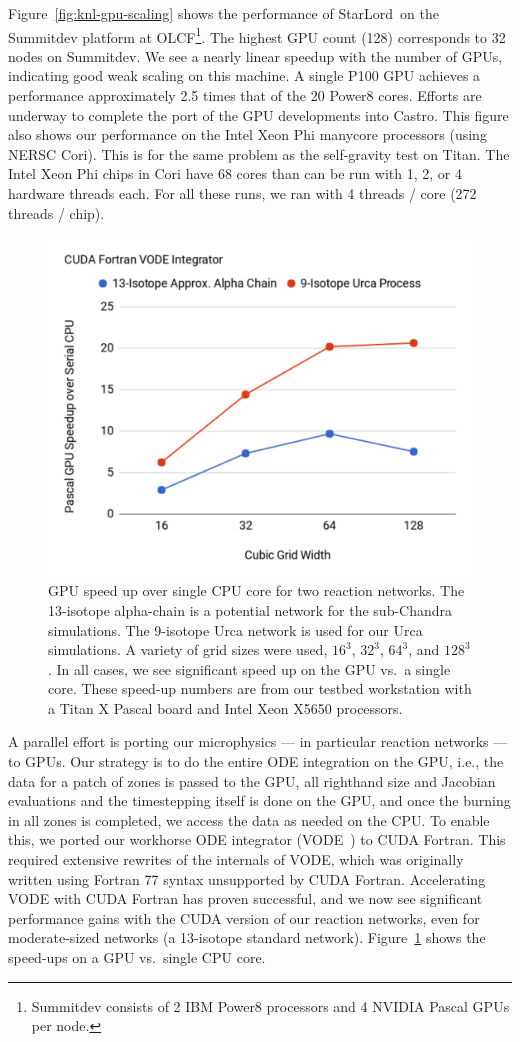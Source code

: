 \documentclass[a4paper]{jpconf}
\newcommand{\castro}{{\sffamily Castro}}
\newcommand{\starlord}{{\sffamily StarLord}}
\begin{document}
Figure~\ref{fig:knl-gpu-scaling} shows the performance of
\starlord\ on the Summitdev platform at OLCF\footnote{Summitdev
  consists of 2 IBM Power8 processors and 4 NVIDIA Pascal GPUs per
  node.}.  The highest GPU count (128) corresponds to 32 nodes on
Summitdev.  We see a nearly linear speedup with the number of GPUs,
indicating good weak scaling on this machine. A single P100 GPU achieves
a performance approximately 2.5 times that of the 20 Power8 cores. Efforts are underway to
complete the port of the GPU developments into \castro.  This figure
also shows our performance on the Intel Xeon Phi manycore processors (using
NERSC Cori).  This is for the same problem as the self-gravity test on
Titan.  The Intel Xeon Phi chips in Cori
have 68 cores than can be run with 1, 2, or 4 hardware threads each.
For all these runs, we ran with 4 threads / core (272
threads / chip).

\begin{figure}[t]
\centering
\includegraphics[width=0.48\linewidth]{CUDA-Fortran-VODE-Integrator}
\begin{minipage}[b]{0.48\linewidth}
\caption{\label{fig:cudaode} GPU speed up over single CPU core for two
  reaction networks.  The 13-isotope alpha-chain is a
  potential network for the sub-Chandra simulations.
  The 9-isotope Urca network is used for our Urca simulations.  A
  variety of grid sizes were used, $16^3$, $32^3$, $64^3$, and
  $128^3$.  In all cases, we see significant speed up on the GPU
  vs.\ a single core.  These speed-up numbers are from our testbed
  workstation with a Titan X Pascal board and Intel Xeon X5650 processors.}
\end{minipage}
\end{figure}

A parallel effort is porting our microphysics --- in particular
reaction networks --- to GPUs.  Our strategy is to do the entire ODE
integration on the GPU, i.e., the data for a patch of zones is passed
to the GPU, all righthand size and Jacobian evaluations and the
timestepping itself is done on the GPU, and once the burning in all
zones is completed, we access the data as needed on the CPU.  To
enable this, we ported our workhorse ODE integrator (VODE~\cite{vode})
to CUDA Fortran. This required extensive rewrites of the internals of
VODE, which was originally written using Fortran 77 syntax unsupported
by CUDA Fortran. Accelerating VODE with CUDA Fortran has proven
successful, and we now see significant performance gains with the CUDA
version of our reaction networks, even for moderate-sized networks (a
13-isotope standard network).  Figure~\ref{fig:cudaode} shows the
speed-ups on a GPU vs.\ single CPU core.
\end{document}
